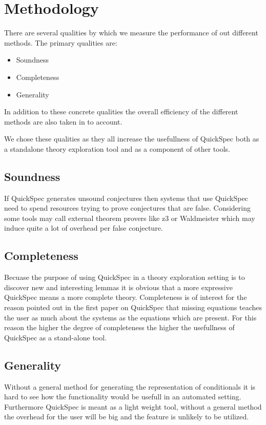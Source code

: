 \section{Methodology}
There are several qualities by which we measure the performance of out different methods.
The primary qualities are:

\begin{itemize}

    \item Soundness
    \item Completeness
    \item Generality

\end{itemize}

In addition to these concrete qualities the overall efficiency of the different methods are also
taken in to account.

We chose these qualities as they all increase the usefullness
of QuickSpec both as a standalone theory exploration tool
and as a component of other tools.

    \subsection{Soundness}
    If QuickSpec generates unsound conjectures then systems that use QuickSpec
    need to spend resources trying to prove conjectures that are false. 
    Considering some tools may call external theorem provers like z3 or Waldmeister %
    which may induce quite a lot of overhead per false conjecture.

    \subsection{Completeness}
    Becuase the purpose of using QuickSpec in a theory exploration setting is to discover
    new and interesting lemmas it is obvious that a more expressive QuickSpec means a more
    complete theory. %
    Completeness is of interest for the reason pointed out in the first paper on QuickSpec that %
    missing equations teaches the user as much about the systems as the equations which are
    present. For this reason the higher the degree of completeness the higher the usefullness
    of QuickSpec as a stand-alone tool. 

    \subsection{Generality}
    Without a general method for generating the representation of conditionals
    it is hard to see how the functionality would be usefull in an automated setting.
    Furthermore QuickSpec is meant as a light weight tool, without a general method
    the overhead for the user will be big and the feature is unlikely to be utilized.


